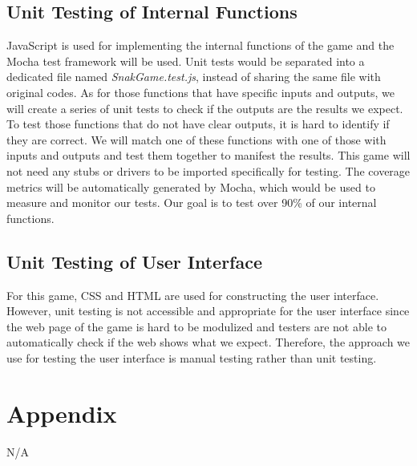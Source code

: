 \documentclass[12pt, titlepage]{article}
\begin{document}
\subsection{Unit Testing of Internal Functions}
JavaScript is used for implementing the internal functions of the game and the Mocha test framework will be used.  Unit tests would be separated into a dedicated file named \emph{SnakGame.test.js}, instead of sharing the same file with original codes. As for those functions that have specific inputs and outputs, we will create a series of unit tests to check if the outputs are the results we expect. To test those functions that do not have clear outputs, it is hard to identify if they are correct. We will match one of these functions with one of those with inputs and outputs and test them together to manifest the results. This game will not need any stubs or drivers to be imported specifically for testing. The coverage metrics will be automatically generated by Mocha, which would be used to measure and monitor our tests. Our goal is to test over 90\% of our internal functions.		
\subsection{Unit Testing of User Interface}	
For this game, CSS and HTML are used for constructing the user interface.    
However, unit testing is not accessible and appropriate for the user interface since the web page of the game is hard to be modulized and testers are not able to automatically check if the web shows what we expect.  Therefore, the approach we use for testing the user interface is manual testing rather than unit testing.





\newpage

\section{Appendix}

N/A
\end{document}
